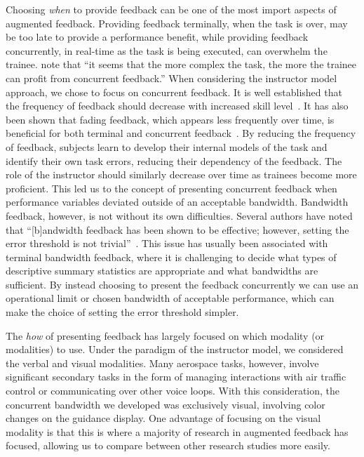 Choosing \textit{when} to provide feedback can be one of the most import aspects of augmented feedback.
Providing feedback terminally, when the task is over, may be too late to provide a performance benefit, while providing feedback concurrently, in real-time as the task is being executed, can overwhelm the trainee.
\citeauthor{sigrist_augmented_2013} note that ``it seems that the more complex the task, the more the trainee can profit from concurrent feedback.''
When considering the instructor model approach, we chose to focus on concurrent feedback.
It is well established that the frequency of feedback should decrease with increased skill level~\citep{doi:10.3200/JMBR.36.2.212-224, timmermans_technology-assisted_2009, Wulf2002, doi:10.1080/00222899809601335}.
It has also been shown that fading feedback, which appears less frequently over time, is beneficial for both terminal and concurrent feedback~\citep{CROWELL201178, KOVACS2011311}.
By reducing the frequency of feedback, subjects learn to develop their internal models of the task and identify their own task errors, reducing their dependency of the feedback.
The role of the instructor should similarly decrease over time as trainees become more proficient.
This led us to the concept of presenting concurrent feedback when performance variables deviated outside of an acceptable bandwidth.
Bandwidth feedback, however, is not without its own difficulties.
Several authors have noted that ``[b]andwidth feedback has been shown to be effective; however, setting the error threshold is not trivial''~\citep{sigrist_augmented_2013, timmermans_technology-assisted_2009, RIBEIRO2011231}.
This issue has usually been associated with terminal bandwidth feedback, where it is challenging to decide what types of descriptive summary statistics are appropriate and what bandwidths are sufficient.
By instead choosing to present the feedback concurrently we can use an operational limit or chosen bandwidth of acceptable performance, which can make the choice of setting the error threshold simpler.

The \textit{how} of presenting feedback has largely focused on which modality (or modalities) to use.
Under the paradigm of the instructor model, we considered the verbal and visual modalities.
Many aerospace tasks, however, involve significant secondary tasks in the form of managing interactions with air traffic control or communicating over other voice loops.
With this consideration, the concurrent bandwidth we developed was exclusively visual, involving color changes on the guidance display.
One advantage of focusing on the visual modality is that this is where a majority of research in augmented feedback has focused, allowing us to compare between other research studies more easily.

